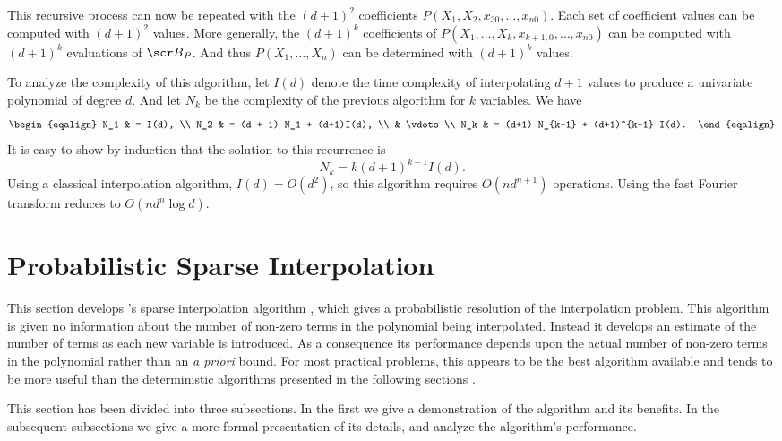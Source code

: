 This recursive process can now be repeated with the $(d+1)^2$
coefficients $P(X_1, X_2, x_{30}, \ldots, x_{n0})$.  Each set of
coefficient values can be computed with $(d+1)^2$ values.  More
generally, the $(d+1)^k$ coefficients of $P(X_1, \ldots, X_k,
x_{k+1,0}, \ldots, x_{n0})$ can be computed with $(d+1)^k$ evaluations
of ${\scr B}_P$.  And thus $P(X_1, \ldots, X_n)$ can be determined
with $(d+1)^k$ values.

To analyze the complexity of this algorithm, let $I(d)$ denote the
time complexity of interpolating $d+1$ values to produce a univariate
polynomial of degree $d$.  And let $N_k$ be the complexity of the
previous algorithm for $k$ variables.  We have
\[
\begin{eqalign}
N_1 & = I(d), \\
N_2 & = (d + 1) N_1 + (d+1)I(d), \\
& \vdots \\
N_k & = (d+1) N_{k-1} + (d+1)^{k-1} I(d).
\end{eqalign}
\]
It is easy to show by induction that the solution to this recurrence
is
\[
N_k = k(d+1)^{k-1} I(d).
\]
Using a classical interpolation algorithm, $I(d) = O(d^2)$, so this
algorithm requires $O(n d^{n+1})$ operations.  Using the fast Fourier
transform reduces to $O(n d^n \log d)$.

\section{Probabilistic Sparse Interpolation}
\label{Interp:PSparse:Sec}

This section develops {\Zippel}'s sparse interpolation algorithm
\cite{Zippel90}, which gives a probabilistic resolution of the
interpolation problem.  This algorithm is given no information about
the number of non-zero terms in the polynomial being interpolated.
Instead it develops an estimate of the number of terms as each new
variable is introduced.  As a consequence its performance depends upon
the actual number of non-zero terms in the polynomial rather than an
{\em a priori} bound.  For most practical problems, this appears to be
the best algorithm available and tends to be more useful than the
deterministic algorithms presented in the following sections \cite{Manocha91}.

This section has been divided into three subsections.  In the first we
give a demonstration of the algorithm and its benefits.  In the
subsequent subsections we give a more formal presentation of its
details, and analyze the algorithm's performance.

